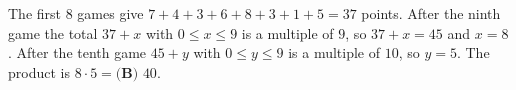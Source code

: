 The first $8$ games give $7+4+3+6+8+3+1+5=37$ points. After the ninth game the total $37+x$ with $0\le x\le9$ is a multiple of $9$, so $37+x=45$ and $x=8$. After the tenth game $45+y$ with $0\le y\le9$ is a multiple of $10$, so $y=5$. The product is $8\cdot5=\boxed{\textbf{(B) }40}$.
